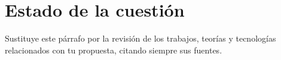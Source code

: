 \chapter{Estado de la cuestión}\label{cap:estado}

Sustituye este párrafo por la revisión de los trabajos, teorías y
tecnologías relacionados con tu propuesta, citando siempre sus fuentes.
